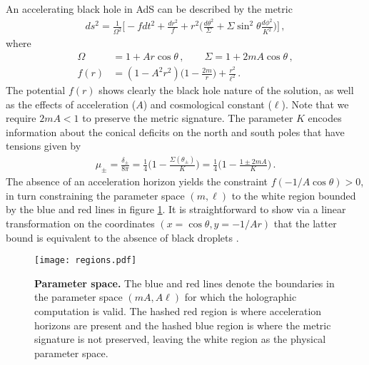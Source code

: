 \documentclass[
twoside,
openright,
frontopenright
]{dmathesis}
\newcommand{\nn}{\nonumber}
\begin{document}
An accelerating black hole in AdS can be described by the metric
\cite{Hong:2003gx}
\begin{align}\label{AdSC}
ds^2=\frac{1}{\Omega^2}\bigg[ -fdt^2+\frac{dr^2}{f}
+r^2\Big(\frac{d\theta^2}{\Sigma}
+\Sigma\sin^2\!\theta\frac{d\phi^2}{K^2}\Big)\bigg]\,,
\end{align}
where
\begin{align}
\Omega&=1+Ar\cos\theta\,, \qquad  \Sigma= 1+2mA\cos\theta\,, \nn\\
f(r)&=(1-A^2r^2)\bigg(1-\frac{2m}{r}\bigg)+\frac{r^2}{\ell^2}\,.
\end{align}
The potential $f(r)$ shows clearly the black hole nature of the solution,
as well as the effects of acceleration ($A$) and cosmological constant ($\ell$).
Note that we require $2mA<1$ to preserve the
metric signature.  The parameter $K$ encodes
information about the conical deficits on the north and south
poles that have tensions given by~\cite{Appels:2017xoe}
\begin{align}
\label{mueq}
\mu_{\pm}=\frac{\delta_\pm}{8\pi}
=\frac{1}{4}\Big(1-\frac{\Sigma(\theta_\pm)}{K}%
\Big)=\frac{1}{4}\Big(1-\frac{1\pm 2mA}{K}\Big)\,.
\end{align}
The absence of an acceleration horizon yields the constraint
$f(-1/A\cos\theta) > 0$, in turn constraining the parameter space $(m,\ell)$ to
the white region bounded by the blue and red lines in figure \ref{fig:f1}.  It
is straightforward to show via a linear transformation \cite{Hong:2003gx} on the
coordinates $(x=\cos\theta,y=-1/Ar)$ that the latter bound is equivalent to the
absence of black droplets \cite{Hubeny:2009kz}.
\begin{figure}[tbp]
\centering
\texttt{[image: regions.pdf]}
\caption{ \textbf{Parameter space.}  The blue and red lines denote the
  boundaries in the parameter space $(mA,A\ell)$ for which the holographic
  computation is valid.  The hashed red region is where acceleration horizons
  are present and the hashed blue region is where the metric signature is not
  preserved, leaving the white region as the physical parameter space.}
\label{fig:f1}
\end{figure}
\end{document}
